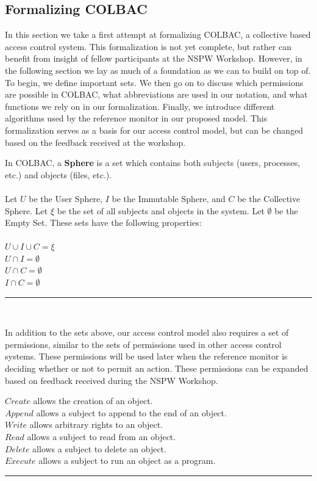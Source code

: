 \subsection{Formalizing COLBAC}
\label{sec:colbacformal}
In this section we take a first attempt at formalizing COLBAC, a collective
based access control system. This formalization is not yet complete, but rather
can benefit from insight of fellow participants at the NSPW Workshop. However,
in the following section we lay as much of a foundation as we can to build on
top of. To begin, we define important sets. We then go on to discuss which
permissions are possible in COLBAC, what abbreviations are used in our notation,
and what functions we rely on in our formalization. Finally, we introduce
different algorithms used by the reference monitor in our proposed model. This
formalization serves as a basis for our access control model, but can be changed
based on the feedback received at the workshop.
\begin{definition}\label{def:spheres}
In COLBAC, a \textbf{Sphere} is a set which contains both subjects (users,
processes, etc.) and objects (files, etc.).\\
\mbox{}\\
Let $U$ be the User Sphere, $I$ be the Immutable Sphere, and $C$ be the
Collective Sphere. Let $\xi$ be the set of all subjects and objects in the
system. Let $\emptyset$ be the Empty Set. These sets have the following
properties:\\
\mbox{}\\
$U \cup I \cup C = \xi$\\
$U \cap I = \emptyset$\\
$U \cap C = \emptyset$\\
$I \cap C = \emptyset$\\
\hrule \mbox{}\\
\end{definition}

\noindent In addition to the sets above, our access control model also requires
a set of permissions, similar to the sets of permissions used in other access
control systems. These permissions will be used later when the reference monitor
is deciding whether or not to permit an action. These permissions can be
expanded based on feedback received during the NSPW Workshop.

\begin{definition}\label{def:permissions}
$Create$ allows the creation of an object.\\
$Append$ allows a subject to append to the end of an object.\\
$Write$ allows arbitrary rights to an object. \\
$Read$ allows a subject to read from an object.\\
$Delete$ allows a subject to delete an object. \\
$Execute$ allows a subject to run an object as a program.\\
\hrule \mbox{}\\
\end{definition}

